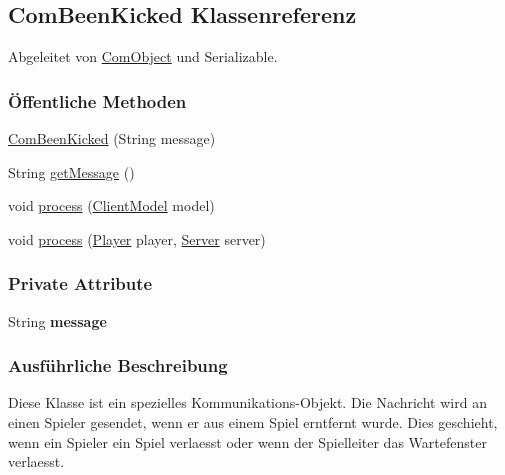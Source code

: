 \hypertarget{a00025}{\subsection{Com\-Been\-Kicked Klassenreferenz}
\label{a00025}
}


Abgeleitet von \hyperlink{a00037}{Com\-Object} und Serializable.

\subsubsection*{Öffentliche Methoden}
\begin{DoxyCompactItemize}
\item 
\hyperlink{a00025_a62d740de69f8a07fdcd3817754fc616e}{Com\-Been\-Kicked} (String message)
\item 
String \hyperlink{a00025_afafd068b736520af1e24269a284980a9}{get\-Message} ()
\item 
void \hyperlink{a00025_a758d7005755a181717f238f714d87dd2}{process} (\hyperlink{a00003}{Client\-Model} model)
\item 
void \hyperlink{a00025_ac67b5ce3ec03d48ef1e6caad6e49c902}{process} (\hyperlink{a00076}{Player} player, \hyperlink{a00077}{Server} server)
\end{DoxyCompactItemize}
\subsubsection*{Private Attribute}
\begin{DoxyCompactItemize}
\item 
\hypertarget{a00025_a2836db0f8ae4563c70935b5e514bdc21}{String {\bfseries message}}\label{a00025_a2836db0f8ae4563c70935b5e514bdc21}

\end{DoxyCompactItemize}


\subsubsection{Ausführliche Beschreibung}
Diese Klasse ist ein spezielles Kommunikations-\/\-Objekt. Die Nachricht wird an einen Spieler gesendet, wenn er aus einem Spiel erntfernt wurde. Dies geschieht, wenn ein Spieler ein Spiel verlaesst oder wenn der Spielleiter das Wartefenster verlaesst. 

